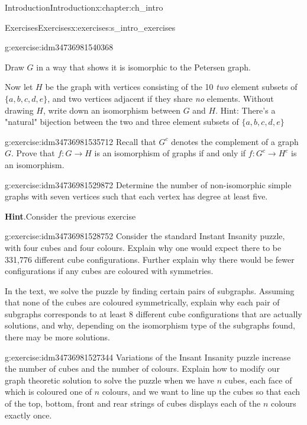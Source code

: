 \documentclass[oneside,10pt,]{book}
\newcommand{\blocktitlefont}{\relax}
\numberwithin{equation}{section}
\begin{document}
\begin{chapterptx}{Introduction}{}{Introduction}{}{}{x:chapter:ch_intro}
\begin{exercises-section}{Exercises}{}{Exercises}{}{}{x:exercises:s_intro_exercises}
\begin{divisionexercise}{5}{}{}{g:exercise:idm34736981540368}
\par
Draw \(G\) in a way that shows it is isomorphic to the Petersen graph.%
\par
Now let \(H\) be the graph with vertices consisting of the 10 \emph{two} element subsets of \(\{a,b,c,d,e\}\), and two vertices adjacent if they share \emph{no} elements.  Without drawing \(H\), write down an isomorphism between \(G\) and \(H\).  Hint: There's a "natural" bijection between the two and three element subsets of \(\{a,b,c,d,e\}\)%
\end{divisionexercise}%
\begin{divisionexercise}{6}{}{}{g:exercise:idm34736981535712}%
Recall that \(G^c\) denotes the complement of a graph \(G\).  Prove that \(f:G\to H\) is an isomorphism of graphs if and only if \(f:G^c\to H^c\) is an isomorphism.%
\end{divisionexercise}%
\begin{divisionexercise}{7}{}{}{g:exercise:idm34736981529872}%
Determine the number of non-isomorphic simple graphs with seven vertices such that each vertex has degree at least five.%
\par\smallskip%
\noindent\textbf{\blocktitlefont Hint}.\hypertarget{g:hint:idm34736981529184}{}\quad{}Consider the previous exercise%
\end{divisionexercise}%
\begin{divisionexercise}{8}{}{}{g:exercise:idm34736981528752}%
Consider the standard Instant Insanity puzzle, with four cubes and four colours.  Explain why one would expect there to be 331,776 different cube configurations.  Further explain why there would be fewer configurations if any cubes are coloured with symmetries.%
\par
In the text, we solve the puzzle by finding certain pairs of subgraphs.  Assuming that none of the cubes are coloured symmetrically, explain why each pair of subgraphs corresponds to at least 8 different cube configurations that are actually solutions, and why, depending on the isomorphism type of the subgraphs found, there may be more solutions.%
\end{divisionexercise}%
\begin{divisionexercise}{9}{}{}{g:exercise:idm34736981527344}%
Variations of the Insant Insanity puzzle increase the number of cubes and the number of colours.  Explain how to modify our graph theoretic solution to solve the puzzle when we have \(n\) cubes, each face of which is coloured one of \(n\) colours, and we want to line up the cubes so that each of the top, bottom, front and rear strings of cubes displays each of the \(n\) colours exactly once.%

\end{divisionexercise}
\end{exercises-section}
\end{chapterptx}
\end{document}
